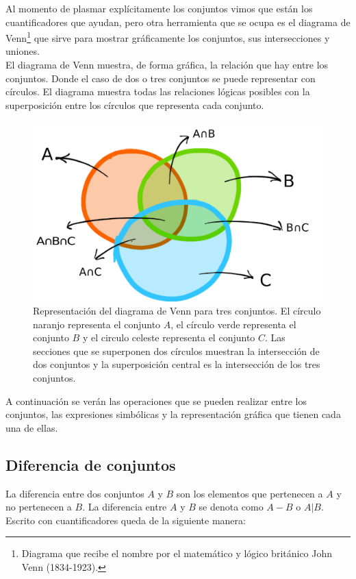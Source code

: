 Al momento de plasmar explícitamente los conjuntos vimos que están los cuantificadores que ayudan, pero otra herramienta que se ocupa es el diagrama de Venn\footnote{Diagrama que recibe el nombre por el matemático y lógico británico John Venn (1834-1923).} que sirve para mostrar gráficamente los conjuntos, sus intersecciones y uniones.\\

El diagrama de Venn muestra, de forma gráfica, la relación que hay entre los conjuntos. Donde el caso de dos o tres conjuntos se puede representar con círculos. El diagrama muestra todas las relaciones lógicas posibles con la superposición entre los círculos que representa cada conjunto.\\
\begin{center}
	\begin{figure}[ht!]
	\centering
    		\includegraphics[scale=0.35]{FiguresBM/DV0.png}
    		\caption[Representación del diagrama de Venn para tres conjuntos]{Representación del diagrama de Venn para tres conjuntos. El círculo naranjo representa el conjunto $A$, el círculo verde representa el conjunto $B$ y el circulo celeste representa el conjunto $C$. Las secciones que se superponen dos círculos muestran la intersección de dos conjuntos y la superposición central es la intersección de los tres conjuntos.}
	\end{figure}
\end{center}

A continuación se verán las operaciones que se pueden realizar entre los conjuntos, las expresiones simbólicas y la representación gráfica que tienen cada una de ellas.\\

\subsection{Diferencia de conjuntos}
La diferencia entre dos conjuntos $A$ y $B$ son los elementos que pertenecen a $A$ y no pertenecen a $B$. La diferencia entre $A$ y $B$ se denota como $A-B$ o $A|B$. Escrito con cuantificadores queda de la siguiente manera: \\

